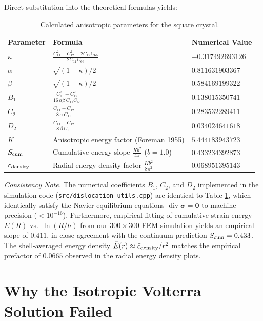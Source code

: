 \documentclass[11pt,a4paper]{article}
\begin{document}
Direct substitution into the theoretical formulas yields:
\begin{table}[h]
\centering
\begin{tabular}{lll}
\toprule
\textbf{Parameter} & \textbf{Formula} & \textbf{Numerical Value} \\
\midrule
$\kappa$ & $\frac{C_{11}^2 - C_{12}^2 - 2 C_{12} C_{66}}{2 C_{11} C_{66}}$ & $-0.317492693126$ \\
$\alpha$ & $\sqrt{(1 - \kappa)/2}$ & $0.811631903367$ \\
$\beta$  & $\sqrt{(1 + \kappa)/2}$ & $0.584169199322$ \\
$B_1$    & $\frac{C_{11}^2 - C_{12}^2}{16\,\alpha\beta\,C_{11} C_{66}}$ & $0.138015350741$ \\
$C_2$    & $\frac{C_{11} + C_{12}}{8\,\alpha\,C_{11}}$ & $0.283532289411$ \\
$D_2$    & $\frac{C_{11} - C_{12}}{8\,\beta\,C_{11}}$ & $0.034024641618$ \\
$K$      & Anisotropic energy factor (Foreman 1955) & $5.444183943723$ \\
$S_{\rm cum}$ & Cumulative energy slope $\frac{K b^2}{4\pi}$ ($b = 1.0$) & $0.433234392873$ \\
$\bar{c}_{\rm density}$ & Radial energy density factor $\frac{K b^2}{8\pi^2}$ & $0.068951395143$ \\
\bottomrule
\end{tabular}
\caption{Calculated anisotropic parameters for the square crystal.}
\label{tab:params}
\end{table}

\noindent\textit{Consistency Note.} The numerical coefficients $B_1$, $C_2$, and $D_2$ implemented in the simulation code (\texttt{src/dislocation\_utils.cpp}) are identical to Table \ref{tab:params}, which identically satisfy the Navier equilibrium equations $\operatorname{div}\bm{\sigma} = \bm{0}$ to machine precision ($< 10^{-16}$). Furthermore, empirical fitting of cumulative strain energy $E(R)$ vs.\ $\ln(R/h)$ from our $300 \times 300$ FEM simulation yields an empirical slope of $0.411$, in close agreement with the continuum prediction $S_{\rm cum} = 0.433$. The shell-averaged energy density $\bar{E}(r) \approx \bar{c}_{\rm density}/r^2$ matches the empirical prefactor of $0.0665$ observed in the radial energy density plots.

\section{Why the Isotropic Volterra Solution Failed}
\end{document}
